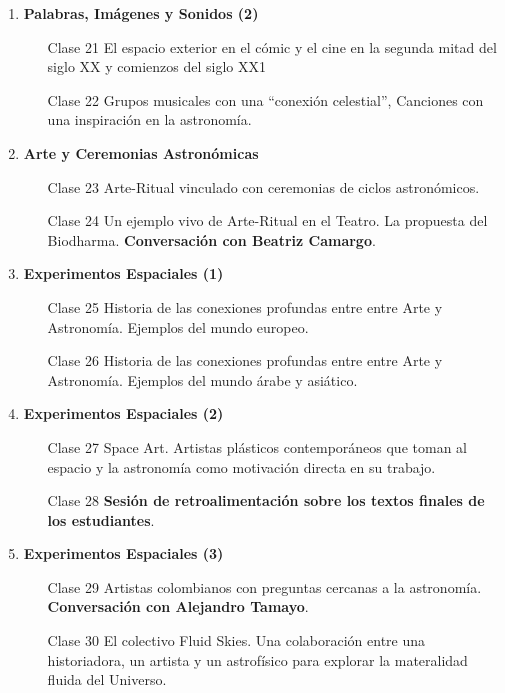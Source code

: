 \documentclass[12pt]{report}
\begin{document}
\begin{enumerate}
\item {\bf Palabras, Im\'agenes y Sonidos (2)}
\begin{itemize}
\item[Clase 21] El espacio exterior en el c\'omic y el cine en la
  segunda mitad del siglo XX y comienzos del siglo XX1 
\item[Clase 22] Grupos musicales con una ``conexi\'on celestial'',
  Canciones con una inspiraci\'on en la astronom\'ia.  
\end{itemize}

\item {\bf Arte y Ceremonias Astron\'omicas}
\begin{itemize}
\item[Clase 23] Arte-Ritual vinculado con ceremonias de ciclos astron\'omicos.
\item[Clase 24] Un ejemplo vivo de Arte-Ritual en el Teatro. La
  propuesta del Biodharma. {\bf Conversaci\'on con Beatriz Camargo}. 
\end{itemize}

\item {\bf Experimentos Espaciales (1)}
\begin{itemize}
\item[Clase 25] Historia de las conexiones profundas entre entre Arte
  y Astronom\'ia. Ejemplos del mundo europeo. 
\item[Clase 26]  Historia de las conexiones profundas entre entre Arte
  y Astronom\'ia. Ejemplos del mundo \'arabe y asi\'atico.
\end{itemize}

\item {\bf Experimentos Espaciales (2)}
\begin{itemize}
\item[Clase 27] Space Art. Artistas pl\'asticos contempor\'aneos que toman al
  espacio y la astronom\'ia como motivaci\'on directa en su trabajo. 
\item[Clase 28]   {\bf Sesi\'on de retroalimentaci\'on sobre los
  textos finales de los estudiantes}. 
\end{itemize}

\item {\bf Experimentos Espaciales (3)}
\begin{itemize}
\item[Clase 29] Artistas colombianos con preguntas cercanas a la
  astronom\'ia. {\bf Conversaci\'on con Alejandro Tamayo}.
\item[Clase 30] El colectivo Fluid Skies. Una colaboraci\'on entre una
  historiadora, un artista y un astrof\'isico para explorar la
  materalidad fluida del Universo.
\end{itemize}

\end{enumerate}
\end{document}

